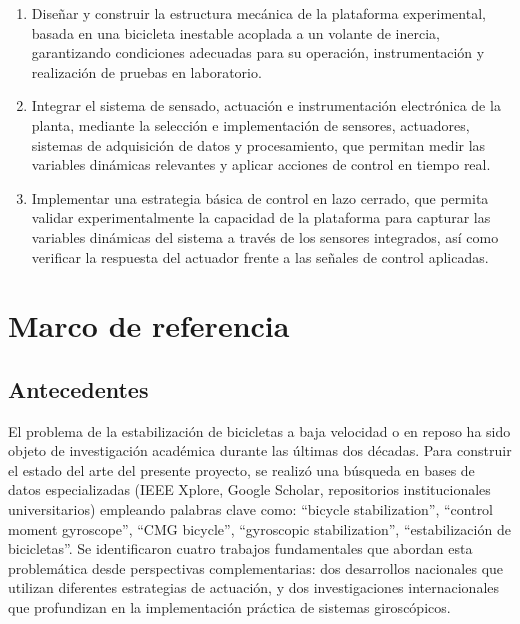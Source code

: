 \documentclass[12pt,letterpaper]{report}
\begin{document}
\begin{enumerate}
    \setlength\itemsep{6pt}
    \item Diseñar y construir la estructura mecánica de la plataforma experimental, basada en una bicicleta inestable acoplada a un volante de inercia, garantizando condiciones adecuadas para su operación, instrumentación y realización de pruebas en laboratorio.
    \item Integrar el sistema de sensado, actuación e instrumentación electrónica de la planta, mediante la selección e implementación de sensores, actuadores, sistemas de adquisición de datos y procesamiento, que permitan medir las variables dinámicas relevantes y aplicar acciones de control en tiempo real.
    \item Implementar una estrategia básica de control en lazo cerrado, que permita validar experimentalmente la capacidad de la plataforma para capturar las variables dinámicas del sistema a través de los sensores integrados, así como verificar la respuesta del actuador frente a las señales de control aplicadas.
\end{enumerate}

\chapter{Marco de referencia}

\section{Antecedentes}

El problema de la estabilización de bicicletas a baja velocidad o en reposo ha sido objeto de investigación académica durante las últimas dos décadas. Para construir el estado del arte del presente proyecto, se realizó una búsqueda en bases de datos especializadas (IEEE Xplore, Google Scholar, repositorios institucionales universitarios) empleando palabras clave como: ``bicycle stabilization'', ``control moment gyroscope'', ``CMG bicycle'', ``gyroscopic stabilization'', ``estabilización de bicicletas''. Se identificaron cuatro trabajos fundamentales que abordan esta problemática desde perspectivas complementarias: dos desarrollos nacionales que utilizan diferentes estrategias de actuación, y dos investigaciones internacionales que profundizan en la implementación práctica de sistemas giroscópicos.
\end{document}
